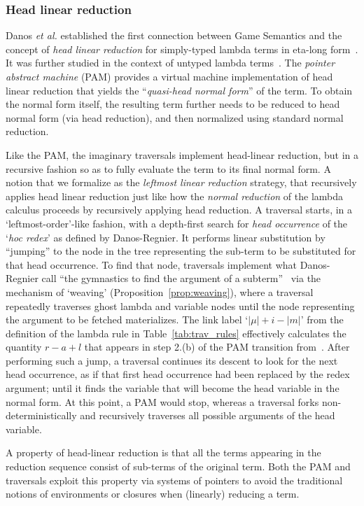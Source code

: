 \documentclass{elsarticle}
\makeatletter
\theoremstyle{plain}
\theoremstyle{definition}
\def\etal{\textit{et al.}\@\xspace}
\makeatother
\begin{document}
\subsubsection{Head linear reduction}
Danos \etal established the first connection between Game Semantics and the concept of \emph{head linear reduction} for simply-typed lambda terms in eta-long form~\cite{danosherbelinregnier1996}. It was further studied in the context of untyped lambda terms~\cite{danos-head}. The \emph{pointer abstract machine} (PAM) provides a virtual machine implementation of head linear reduction that yields the ``\emph{quasi-head normal form}'' of the term. To obtain the normal form itself, the resulting term further needs to be reduced to head normal form (via head reduction), and then normalized using standard normal reduction.

Like the PAM, the imaginary traversals implement head-linear reduction, but in a recursive fashion so as to fully evaluate the term to its final normal form.
A notion that we formalize as the \emph{leftmost linear reduction} strategy, that recursively applies head linear reduction just like how the \emph{normal reduction} of the lambda calculus proceeds by recursively applying head reduction.
A traversal starts, in a `leftmost-order'-like fashion, with a depth-first search for \emph{head occurrence} of the `\emph{hoc redex}' as defined by Danos-Regnier. It performs linear substitution by ``jumping'' to the node in the tree representing the sub-term to be substituted for that head occurrence.
To find that node, traversals implement what Danos-Regnier call ``the gymnastics to find the argument of a subterm''~\cite{danos-head} via the mechanism of `weaving' (Proposition~\ref{prop:weaving}),
where a traversal repeatedly traverses ghost lambda and variable nodes until the node representing the argument to be fetched materializes.
The link label `$|\mu|+i-|m|$' from the definition
of the lambda rule in Table~\ref{tab:trav_rules} effectively calculates the quantity $r-a+l$ that appears in step 2.(b) of the PAM transition from~\cite{danos-head}.
After performing such a jump, a traversal continues its descent to look for the next head occurrence, as if that first head occurrence had been replaced by the redex argument; until it finds the variable that will become the head variable in the normal form. At this point, a PAM would stop, whereas a traversal forks  non-deterministically and recursively traverses all possible arguments of the head variable.

A property of head-linear reduction is that all the terms appearing in the reduction sequence consist of sub-terms of the original term.
Both the PAM and traversals exploit this property via systems of pointers to avoid the traditional notions of environments or closures when (linearly) reducing a term.
\end{document}
